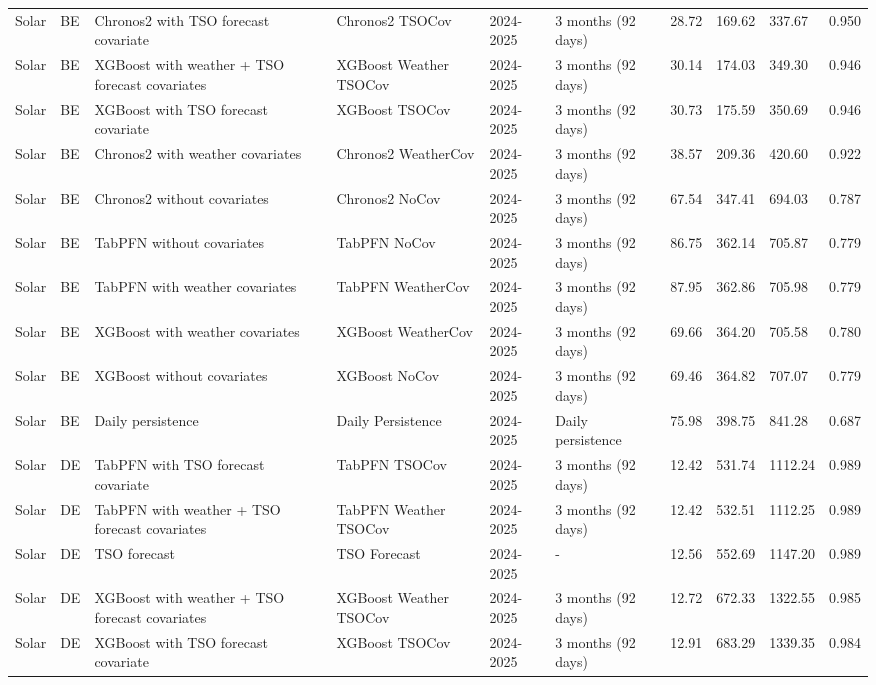 \begin{longtable}{llllllllll}
Solar & BE & Chronos2 with TSO forecast covariate & Chronos2 TSOCov & 2024-2025 & 3 months (92 days) & 28.72 & 169.62 & 337.67 & 0.950 \\
Solar & BE & XGBoost with weather + TSO forecast covariates & XGBoost Weather TSOCov & 2024-2025 & 3 months (92 days) & 30.14 & 174.03 & 349.30 & 0.946 \\
Solar & BE & XGBoost with TSO forecast covariate & XGBoost TSOCov & 2024-2025 & 3 months (92 days) & 30.73 & 175.59 & 350.69 & 0.946 \\
Solar & BE & Chronos2 with weather covariates & Chronos2 WeatherCov & 2024-2025 & 3 months (92 days) & 38.57 & 209.36 & 420.60 & 0.922 \\
Solar & BE & Chronos2 without covariates & Chronos2 NoCov & 2024-2025 & 3 months (92 days) & 67.54 & 347.41 & 694.03 & 0.787 \\
Solar & BE & TabPFN without covariates & TabPFN NoCov & 2024-2025 & 3 months (92 days) & 86.75 & 362.14 & 705.87 & 0.779 \\
Solar & BE & TabPFN with weather covariates & TabPFN WeatherCov & 2024-2025 & 3 months (92 days) & 87.95 & 362.86 & 705.98 & 0.779 \\
Solar & BE & XGBoost with weather covariates & XGBoost WeatherCov & 2024-2025 & 3 months (92 days) & 69.66 & 364.20 & 705.58 & 0.780 \\
Solar & BE & XGBoost without covariates & XGBoost NoCov & 2024-2025 & 3 months (92 days) & 69.46 & 364.82 & 707.07 & 0.779 \\
Solar & BE & Daily persistence & Daily Persistence & 2024-2025 & Daily persistence & 75.98 & 398.75 & 841.28 & 0.687 \\
Solar & DE & TabPFN with TSO forecast covariate & TabPFN TSOCov & 2024-2025 & 3 months (92 days) & 12.42 & 531.74 & 1112.24 & 0.989 \\
Solar & DE & TabPFN with weather + TSO forecast covariates & TabPFN Weather TSOCov & 2024-2025 & 3 months (92 days) & 12.42 & 532.51 & 1112.25 & 0.989 \\
Solar & DE & TSO forecast & TSO Forecast & 2024-2025 & - & 12.56 & 552.69 & 1147.20 & 0.989 \\
Solar & DE & XGBoost with weather + TSO forecast covariates & XGBoost Weather TSOCov & 2024-2025 & 3 months (92 days) & 12.72 & 672.33 & 1322.55 & 0.985 \\
Solar & DE & XGBoost with TSO forecast covariate & XGBoost TSOCov & 2024-2025 & 3 months (92 days) & 12.91 & 683.29 & 1339.35 & 0.984 \\

\end{longtable}
